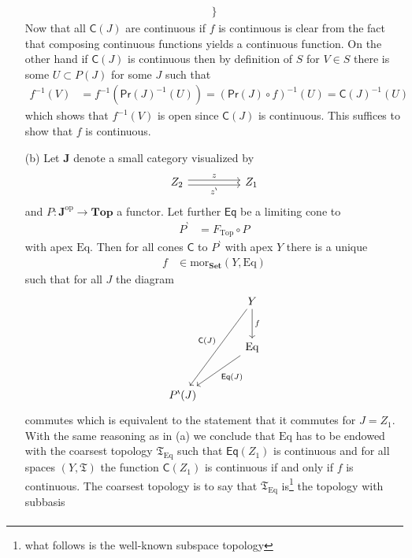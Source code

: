 \begin{prf}
\begin{enumerate}
\begin{align*}
  \rbrace
\end{align*}
Now that all $\mathsf{C}(J)$ are continuous if $f$ is continuous is clear from the fact that composing continuous functions yields a continuous function. On the other hand if $\mathsf{C}(J)$ is continuous then by definition of $S$ for $V \in S$ there is some $U \subset P(J)$ for some $J$ such that
\begin{align*}
  f^{-1}(V)
  &=
  f^{-1}(\mathsf{Pr}(J)^{-1}(U))
  =
  \left(
    \mathsf{Pr}(J)
    \circ
    f
  \right)^{-1}
  (U)
  =
  \mathsf{C}(J)^{-1}(U)
\end{align*}
which shows that $f^{-1}(V)$ is open since $\mathsf{C}(J)$ is continuous. This suffices to show that $f$ is continuous.
\item[(b)]
Let $\mathbf{J}$ denote a small category visualized by
\[
\begin{tikzcd}[sep=huge]
  Z_{2}
  \arrow[shift left=0.5ex]{r}{z}
  \arrow[swap,shift right=0.5ex]{r}{z^{\backprime}}
  &
  Z_{1}
\end{tikzcd}
\]
and $P \colon \mathbf{J}^{\mathrm{op}} \rightarrow \mathbf{Top}$ a functor. Let further $\mathsf{Eq}$ be a limiting cone to
\begin{align*}
  P^{\backprime}
  &=
  F_{\mathrm{Top}}
  \circ
  P
\end{align*}
with apex $\mathrm{Eq}$. Then for all cones $\mathsf{C}$ to $P^{\backprime}$ with apex $Y$ there is a unique
\begin{align*}
  f
  &\in
  \mathrm{mor}_{\mathbf{Set}}
  \left(
    Y,
    \mathrm{Eq}
  \right)
\end{align*}
such that for all $J$ the diagram
\[
\begin{tikzcd}[sep=large]
  &
  Y
  \arrow{d}{f}
  \arrow[swap]{ddl}{\mathsf{C}(J)}
  \\
  &
  \mathrm{Eq}
  \arrow{dl}{\mathsf{Eq}(J)}
  \\
  P^{\backprime}(J)
\end{tikzcd}
\]
commutes which is equivalent to the statement that it commutes for $J = Z_{1}$. With the same reasoning as in (a) we conclude that $\mathrm{Eq}$ has to be endowed with the coarsest topology $\mathfrak{T}_{\mathrm{Eq}}$ such that $\mathsf{Eq}(Z_{1})$ is continuous and for all spaces $(Y,\mathfrak{T})$ the function $\mathsf{C}(Z_{1})$ is continuous if and only if $f$ is continuous. The coarsest topology is to say that $\mathfrak{T}_{\mathrm{Eq}}$ is\footnote{what follows is the well-known subspace topology} the topology with subbasis
\begin{align*}

\end{align*}
\end{enumerate}
\end{prf}
